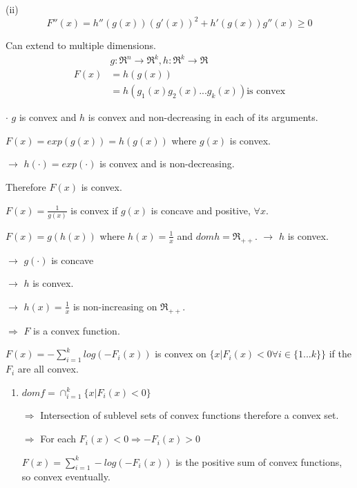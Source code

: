 (ii) 
\begin{equation*}
F''(x) = h''(g(x))(g'(x))^2 + h'(g(x))g''(x) \geq 0
\end{equation*}

Can extend to multiple dimensions.
\begin{align*}
&g:\Re^n\rightarrow \Re^k, h:\Re^k\rightarrow \Re\\
F(x) &= h(g(x))\\
&= h(g_1(x) g_2(x)...g_k(x)) \text{is convex}
\end{align*}

$\cdot$ $g$ is convex and $h$ is convex and non-decreasing in each of its arguments. 

\begin{example}
	$F(x) = exp(g(x)) = h(g(x))$ where $g(x)$ is convex. 
	
	$\rightarrow$ $h(\cdot) = exp(\cdot)$ is convex and is non-decreasing.
	
	Therefore $F(x)$ is convex. 
\end{example}

\begin{example}
	$F(x) = \frac{1}{g(x)}$ is convex if $g(x)$ is concave and positive, $\forall x$. 
	
	$F(x) = g(h(x))$ where $h(x) = \frac{1}{x}$ and $domh = \Re_{++}$. $\rightarrow$ $h$ is convex.
	
	$\rightarrow$ $g(\cdot)$ is concave 
	
	$\rightarrow$ $h$ is convex.
	
	$\rightarrow$ $h(x) = \frac{1}{x}$ is non-increasing on $\Re_{++}$.
	
	$\Rightarrow$ $F$ is a convex function. 
\end{example}

\begin{example}
	$F(x) = -\sum^k_{i=1}log(-F_i(x))$ is convex on $\{x\vert F_i(x)<0\forall i\in \{1...k \}  \}$ if the $F_i$ are all convex.
	
	\begin{enumerate}
		\item $domf = \cap^k_{i=1}\{x\vert F_i(x) <0 \}$
		
		$\Rightarrow$ Intersection of sublevel sets of convex functions therefore a convex set.
		
		$\Rightarrow$ For each $F_i(x)<0\Rightarrow -F_i(x) >0$
		
		$F(x) = \sum^k_{i=1} -log(-F_i(x))$ is the positive sum of convex functions, so convex eventually.
	\end{enumerate}
\end{example}










